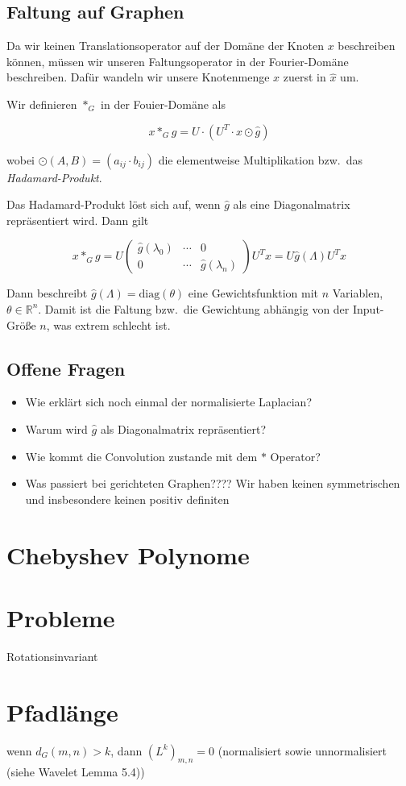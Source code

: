 \subsection{Faltung auf Graphen}

Da wir keinen Translationsoperator auf der Domäne der Knoten $x$ beschreiben können, müssen wir unseren Faltungsoperator in der Fourier-Domäne beschreiben.
Dafür wandeln wir unsere Knotenmenge $x$ zuerst in $\hat x$ um.

Wir definieren $*_G$ in der Fouier-Domäne als

\begin{equation}
  x *_G g = U \cdot (U^T \cdot x \odot \hat g)
\end{equation}

wobei $\odot(A, B) = (a_{ij} \cdot b_{ij})$ die elementweise Multiplikation bzw.\ das \emph{Hadamard-Produkt}.

Das Hadamard-Produkt löst sich auf, wenn $\hat g$ als eine Diagonalmatrix repräsentiert wird. Dann gilt

\begin{equation}
  x *_G g = U \begin{pmatrix}
    \hat g(\lambda_0) & \cdots & 0\\
    0 & \cdots & \hat g(\lambda_n)
  \end{pmatrix}U^T x = U \hat g(\Lambda) U^T x
\end{equation}

Dann beschreibt $\hat g(\Lambda) = \text{diag}(\theta)$ eine Gewichtsfunktion mit $n$ Variablen, $\theta \in \mathbb{R}^n$.
Damit ist die Faltung bzw.\ die Gewichtung abhängig von der Input-Größe $n$, was extrem schlecht ist.

\subsection{Offene Fragen}

\begin{itemize}
  \item Wie erklärt sich noch einmal der normalisierte Laplacian?
  \item Warum wird $\hat g$ als Diagonalmatrix repräsentiert?
  \item Wie kommt die Convolution zustande mit dem $*$ Operator?
  \item Was passiert bei gerichteten Graphen???? Wir haben keinen symmetrischen und insbesondere keinen positiv definiten
\end{itemize}

\section{Chebyshev Polynome}

\section{Probleme}

Rotationsinvariant

\section{Pfadlänge}

wenn $d_G(m,n) > k$, dann ${(L^k)}_{m, n} = 0$
(normalisiert sowie unnormalisiert (siehe Wavelet Lemma 5.4))
